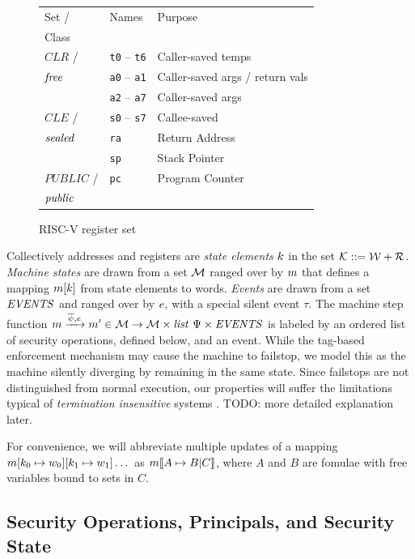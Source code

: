 \documentclass[10pt,conference]{ieeetran}%
\theoremstyle{definition}
\begin{document}
\begin{figure}
  \begin{tabular}{| l | l | l |}
    \hline
    Set / & Names & Purpose \\
    Class & & \\
    \hline
    \(\mathit{CLR}\) / & {\tt t0} -- {\tt t6} & Caller-saved temps \\
    \(\mathit{free}\) & {\tt a0} -- {\tt a1} & Caller-saved args / return vals \\
    & {\tt a2} -- {\tt a7} & Caller-saved args \\
    \hline
    \(\mathit{CLE}\) / & {\tt s0} -- {\tt s7} & Callee-saved \\
    \(\mathit{sealed}\) & {\tt ra} & Return Address \\
    & {\tt sp} & Stack Pointer \\  
    \hline
    \(\mathit{PUBLIC}\) / & {\tt pc} & Program Counter \\
    \(\mathit{public}\) & & \\
    \hline
  \end{tabular}
  \caption{RISC-V register set}
  \label{fig:RISCVregs}
\end{figure}

Collectively addresses and registers are {\em state elements} \(k\)
in the set \({\mathcal K} ::= {\mathcal W} + {\mathcal R}\).
%
{\em Machine states} are drawn from a set \({\mathcal M}\) ranged over by \(m\)
that defines a mapping \(m[k]\) from state elements to words.
{\em Events} are drawn from a set \(\mathit{EVENTS}\) and ranged over by \(e\), with a
special silent event \(\tau\).
The machine step function
\(m \xrightarrow{\overline{\psi},e} m' \in {\mathcal M} \rightarrow
{\mathcal M} \times \mathit{list} ~ \Psi \times \mathit{EVENTS}\)
is labeled by an ordered list of security operations, defined below,
and an event.
While the tag-based enforcement mechanism may cause the machine to
failstop, we model this as the machine silently diverging by remaining in the
same state. Since failstops are not distinguished from normal execution,
our properties will suffer the limitations typical of
{\it termination insensitive} systems \cite{}. TODO: more detailed explanation later.

For convenience, we will abbreviate multiple updates of a mapping
\(m[k_0 \mapsto w_0][k_1 \mapsto w_1]\dots\)
as \(m \llbracket A \mapsto B | C \rrbracket\), where \(A\) and \(B\)
are fomulae with free variables bound to sets in \(C\).

\subsection{Security Operations, Principals, and Security State}
\end{document}
